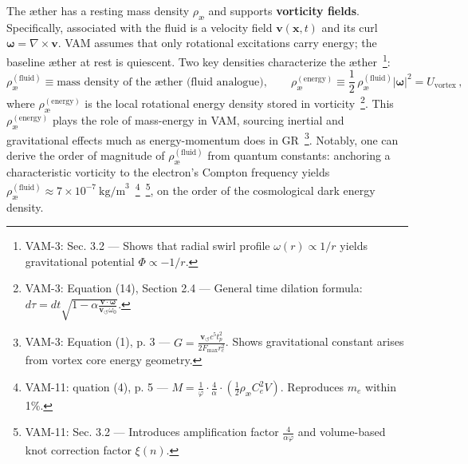 \documentclass[a4paper,12pt]{article}
\begin{document}
    The æther has a resting mass density $\rho_{\text{\ae}}$ and supports \textbf{vorticity fields}. Specifically, associated with the fluid is a velocity field $\mathbf{v}(\mathbf{x},t)$ and its curl $\boldsymbol{\omega} = \nabla \times \mathbf{v}$. VAM assumes that only rotational excitations carry energy; the baseline æther at rest is quiescent. Two key densities characterize the æther~\footnote{VAM-3: Sec. 3.2 — Shows that radial swirl profile $\omega(r) \propto 1/r$ yields gravitational potential $\Phi \propto -1/r$.}:
    \begin{equation}
        \rho_{\text{\ae}}^{(\text{fluid})} \equiv \text{mass density of the æther (fluid analogue)}, \qquad
        \rho_{\text{\ae}}^{(\text{energy})} \equiv \frac{1}{2}\,\rho_{\text{\ae}}^{(\text{fluid})} |\boldsymbol{\omega}|^2 = U_{\text{vortex}}\,,
        \label{eq:aether-densities}
    \end{equation}
    where $\rho_{\text{\ae}}^{(\text{energy})}$ is the local rotational energy density stored in vorticity~\footnote{VAM-3: Equation (14), Section 2.4 — General time dilation formula: $d\tau = dt \sqrt{1 - \alpha \frac{\mathbf{v} \cdot \boldsymbol{\omega}}{\mathbf{v}_{\scriptscriptstyle\boldsymbol{\circlearrowleft}} \omega_0}}$.}. This $\rho_{\text{\ae}}^{(\text{energy})}$ plays the role of mass-energy in VAM, sourcing inertial and gravitational effects much as energy-momentum does in GR~\footnote{VAM-3: Equation (1), p. 3 — $G = \frac{\mathbf{v}_{\scriptscriptstyle\boldsymbol{\circlearrowleft}} c^5 t_p^2}{2 F_{\max} r_c^2}$. Shows gravitational constant arises from vortex core energy geometry.}. Notably, one can derive the order of magnitude of $\rho_{\text{\ae}}^{(\text{fluid})}$ from quantum constants: anchoring a characteristic vorticity to the electron’s Compton frequency yields $\rho_{\text{\ae}}^{(\text{fluid})} \approx 7\times 10^{-7}~\text{kg/m}^3$~\footnote{VAM-11: quation (4), p. 5 — $M = \frac{1}{\varphi} \cdot \frac{4}{\alpha} \cdot \left( \frac{1}{2} \rho_{\text{\ae}} C_e^2 V \right)$. Reproduces $m_e$ within 1\%.}~\footnote{VAM-11: Sec. 3.2 — Introduces amplification factor $\frac{4}{\alpha\varphi}$ and volume-based knot correction factor $\xi(n)$.}, on the order of the cosmological dark energy density.
\end{document}
